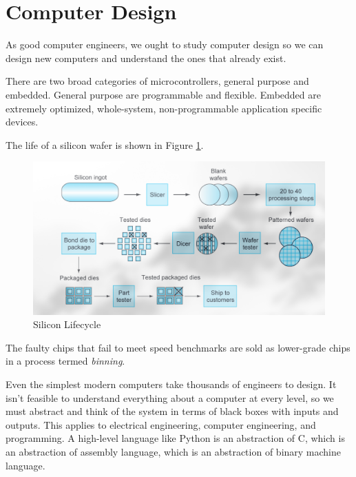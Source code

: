 \section{Computer Design}

As good computer engineers, we ought to study computer
design so we can design new computers and understand
the ones that already exist.

There are two broad categories of microcontrollers,
general purpose and embedded. General purpose are
programmable and flexible. Embedded are extremely
optimized, whole-system, non-programmable application
specific devices.

The life of a silicon wafer is shown in Figure
\ref{fig:silicon}.
\begin{figure}
    \includegraphics{images/silicon.png}
    \caption{Silicon Lifecycle}
    \label{fig:silicon}
\end{figure}
The faulty chips that fail to meet speed benchmarks
are sold as lower-grade chips in a process termed
\emph{binning}.

Even the simplest modern computers take thousands
of engineers to design. It isn't feasible to
understand everything about a computer at every
level, so we must abstract and think of the system
in terms of black boxes with inputs and outputs. This
applies to electrical engineering, computer engineering,
and programming. A high-level language like Python is
an abstraction of C, which is an abstraction of assembly
language, which is an abstraction of binary machine language.
